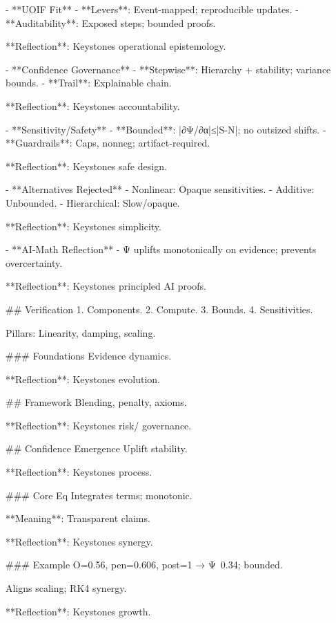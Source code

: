 - **UOIF Fit**
  - **Levers**: Event-mapped; reproducible updates.
  - **Auditability**: Exposed steps; bounded proofs.

**Reflection**: Keystones operational epistemology.

- **Confidence Governance**
  - **Stepwise**: Hierarchy + stability; variance bounds.
  - **Trail**: Explainable chain.

**Reflection**: Keystones accountability.

- **Sensitivity/Safety**
  - **Bounded**: |∂Ψ/∂α|≤|S-N|; no outsized shifts.
  - **Guardrails**: Caps, nonneg; artifact-required.

**Reflection**: Keystones safe design.

- **Alternatives Rejected**
  - Nonlinear: Opaque sensitivities.
  - Additive: Unbounded.
  - Hierarchical: Slow/opaque.

**Reflection**: Keystones simplicity.

- **AI-Math Reflection**
  - Ψ uplifts monotonically on evidence; prevents overcertainty.

**Reflection**: Keystones principled AI proofs.

## Verification
1. Components.
2. Compute.
3. Bounds.
4. Sensitivities.

Pillars: Linearity, damping, scaling.

### Foundations
Evidence dynamics.

**Reflection**: Keystones evolution.

## Framework
Blending, penalty, axioms.

**Reflection**: Keystones risk/ governance.

## Confidence Emergence
Uplift stability.

**Reflection**: Keystones process.

### Core Eq
Integrates terms; monotonic.

**Meaning**: Transparent claims.

**Reflection**: Keystones synergy.

### Example
O=0.56, pen=0.606, post=1 → Ψ~0.34; bounded.

Aligns scaling; RK4 synergy.

**Reflection**: Keystones growth.

